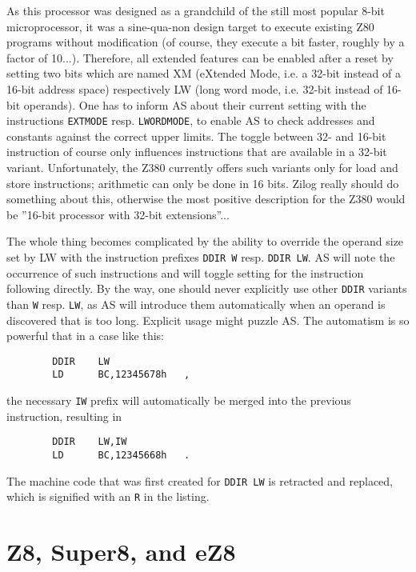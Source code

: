 \documentclass[12pt,twoside]{report}
\newcommand{\tty}[1]{{\tt #1}}
\newcommand{\asname}{{AS}}
\begin{document}
As this processor was designed as a grandchild of the still most popular
8-bit microprocessor, it was a sine-qua-non design target to execute
existing Z80 programs without modification (of course, they execute a bit
faster, roughly by a factor of 10...).  Therefore, all extended features
can be enabled after a reset by setting two bits which are named XM
(eXtended Mode, i.e. a 32-bit instead of a 16-bit address space)
respectively LW (long word mode, i.e. 32-bit instead of 16-bit operands).
One has to inform \asname{} about their current setting with the instructions
\tty{EXTMODE} resp. \tty{LWORDMODE}, to enable \asname{} to check addresses and
constants against the correct upper limits.  The toggle between 32- and
16-bit instruction of course only influences instructions that are
available in a 32-bit variant.  Unfortunately, the Z380 currently offers
such variants only for load and store instructions; arithmetic can only be
done in 16 bits.  Zilog really should do something about this, otherwise
the most positive description for the Z380 would be ''16-bit processor
with 32-bit extensions''...

The whole thing becomes complicated by the ability to override the operand
size set by LW with the instruction prefixes \tty{DDIR W} resp.
\tty{DDIR LW}.  \asname{} will note the occurrence of such instructions and will
toggle setting for the instruction following directly.  By the way, one
should never explicitly use other \tty{DDIR} variants than \tty{W} resp.
\tty{LW}, as \asname{} will introduce them automatically when an operand is
discovered that is too long.  Explicit usage might puzzle \asname{}.  The
automatism is so powerful that in a case like this:
\begin{verbatim}
        DDIR    LW
        LD      BC,12345678h   ,
\end{verbatim}
the necessary \tty{IW} prefix will automatically be merged into the previous
instruction, resulting in
\begin{verbatim}
        DDIR    LW,IW
        LD      BC,12345668h   .
\end{verbatim}
The machine code that was first created for \tty{DDIR LW} is retracted and
replaced, which is signified with an \tty{R} in the listing.


\section{Z8, Super8, and eZ8}
\label{Z8Spec}
\end{document}
